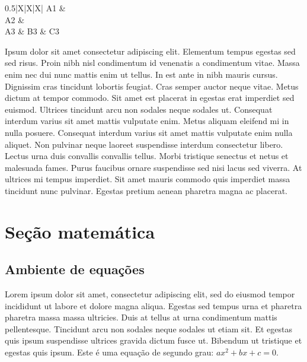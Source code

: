 \documentclass[12pt]{article}
\begin{document}
			\renewcommand{\arraystretch}{3} %
			\begin{table}[H]
				\centering
				\caption[Legenda curta da tabela 3]{Legenda longa da tabela 3}
				\label{tab:tab3}
				\begin{tabularx}{0.5\textwidth}{|X|X|X|} %
					\hline
					\centering A1 &  %
									 {} %
									 \\  %
					\hfill A2 &                     \\ \hline %
					A3 & B3                  & C3                 \\ \hline
				\end{tabularx}
				\vspace{-20pt}
			\end{table}
			\renewcommand{\arraystretch}{1}
			
			Ipsum dolor sit amet consectetur adipiscing elit. Elementum tempus egestas sed sed risus. Proin nibh nisl condimentum id venenatis a condimentum vitae. Massa enim nec dui nunc mattis enim ut tellus. In est ante in nibh mauris cursus. Dignissim cras tincidunt lobortis feugiat. Cras semper auctor neque vitae. Metus dictum at tempor commodo. Sit amet est placerat in egestas erat imperdiet sed euismod. Ultrices tincidunt arcu non sodales neque sodales ut. Consequat interdum varius sit amet mattis vulputate enim. Metus aliquam eleifend mi in nulla posuere. Consequat interdum varius sit amet mattis vulputate enim nulla aliquet. Non pulvinar neque laoreet suspendisse interdum consectetur libero. Lectus urna duis convallis convallis tellus. Morbi tristique senectus et netus et malesuada fames. Purus faucibus ornare suspendisse sed nisi lacus sed viverra. At ultrices mi tempus imperdiet. Sit amet mauris commodo quis imperdiet massa tincidunt nunc pulvinar. Egestas pretium aenean pharetra magna ac placerat.
			\newpage
			
			
			\section{Seção matemática}
			\subsection{Ambiente de equações}
				Lorem ipsum dolor sit amet, consectetur adipiscing elit, sed do eiusmod tempor incididunt ut labore et dolore magna aliqua. Egestas sed tempus urna et pharetra pharetra massa massa ultricies. Duis at tellus at urna condimentum mattis pellentesque. Tincidunt arcu non sodales neque sodales ut etiam sit. Et egestas quis ipsum suspendisse ultrices gravida dictum fusce ut. Bibendum ut tristique et egestas quis ipsum. 
				Este é uma equação de segundo grau: $ ax^2 +bx +c = 0$. %
				
\end{document}
